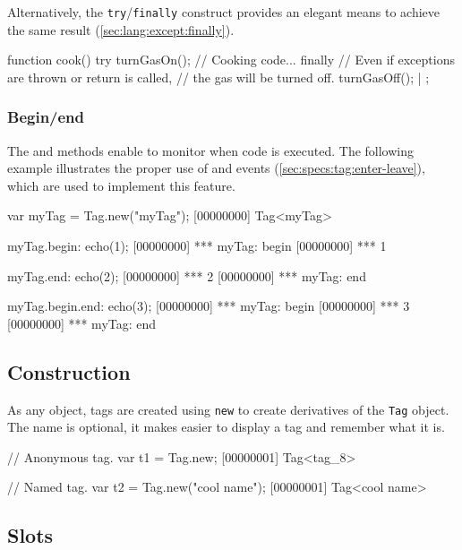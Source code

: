 Alternatively, the \lstinline|try|/\lstinline|finally| construct provides an
elegant means to achieve the same result (\autoref{sec:lang:except:finally}).

\begin{urbiscript}
{
  function cook()
  {
    try
    {
      turnGasOn();
      // Cooking code...
    }
    finally
    {
      // Even if exceptions are thrown or return is called,
      // the gas will be turned off.
      turnGasOff();
    }
  }|
};
\end{urbiscript}

\subsubsection{Begin/end}
\label{sec:specs:tag:begin-end}

The  and  methods enable to monitor when code is
executed.  The following example illustrates the proper use of
 and  events
(\autoref{sec:specs:tag:enter-leave}), which are used to implement this
feature.

\begin{urbiscript}
var myTag = Tag.new("myTag");
[00000000] Tag<myTag>

myTag.begin: echo(1);
[00000000] *** myTag: begin
[00000000] *** 1

myTag.end: echo(2);
[00000000] *** 2
[00000000] *** myTag: end

myTag.begin.end: echo(3);
[00000000] *** myTag: begin
[00000000] *** 3
[00000000] *** myTag: end
\end{urbiscript}

\subsection{Construction}
\label{stdlib:tag:ctor}

As any object, tags are created using \lstinline{new} to create derivatives
of the \lstinline{Tag} object.  The name is optional, it makes easier to
display a tag and remember what it is.

\begin{urbiscript}[firstnumber=1]
// Anonymous tag.
var t1 = Tag.new;
[00000001] Tag<tag_8>

// Named tag.
var t2 = Tag.new("cool name");
[00000001] Tag<cool name>
\end{urbiscript}

\subsection{Slots}

